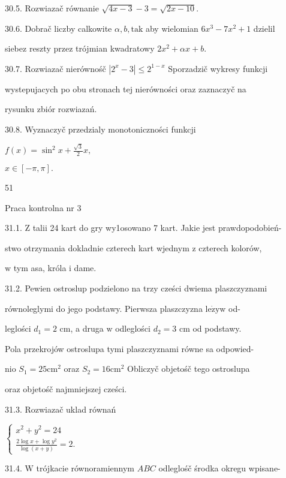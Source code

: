 \documentclass[a4paper,12pt]{article}
\begin{document}
30.5. Rozwiazač równanie $\sqrt{4x-3}-3=\sqrt{2x-10}.$

30.6. Dobrač liczby calkowite $\alpha, b, \mathrm{t}\mathrm{a}\mathrm{k}$ aby wielomian $6x^{3}-7x^{2}+1$ dzielil

siebez reszty przez trójmian kwadratowy $2x^{2}+\alpha x+b.$

30.7. Rozwiazač nierównośč $|2^{x}-3| \leq 2^{1-x}$ Sporzadzič wykresy funkcji

wystepujacych po obu stronach tej nierówności oraz zaznaczyč na

rysunku zbiór rozwiazań.

30.8. Wyznaczyč przedzialy monotoniczności funkcji

$f(x)=\displaystyle \sin^{2}x+\frac{\sqrt{3}}{2}x,$

$x\in[-\pi,\pi].$





51

Praca kontrolna nr 3

31.1. $\mathrm{Z}$ talii 24 kart do gry wy1osowano 7 kart. Jakie jest prawdopodobień-

stwo otrzymania dokladnie czterech kart wjednym $\mathrm{z}$ czterech kolorów,

$\mathrm{w}$ tym asa, króla $\mathrm{i}$ dame.

31.2. Pewien ostroslup podzielono na trzy cześci dwiema plaszczyznami

równoleglymi do jego podstawy. Pierwsza plaszczyzna $\mathrm{l}\mathrm{e}\dot{\mathrm{z}}\mathrm{y} \mathrm{w}$ od-

leglości $d_{1} = 2$ cm, a druga $\mathrm{w}$ odleglości $d_{2} = 3$ cm od podstawy.

Pola przekrojów ostroslupa tymi plaszczyznami równe sa odpowied-

nio $S_{1}=25\mathrm{c}\mathrm{m}^{2}$ oraz $S_{2}=16\mathrm{c}\mathrm{m}^{2}$ Obliczyč objetośč tego ostroslupa

oraz objetośč najmniejszej cześci.

31.3. Rozwiazač uklad równań

$\left\{\begin{array}{l}
x^{2}+y^{2}=24\\
\frac{2\log x+\log y^{2}}{\log(x+y)}=2.
\end{array}\right.$

31.4. $\mathrm{W}$ trójkacie równoramiennym $ABC$ odleglośč środka okregu wpisane-
\end{document}
